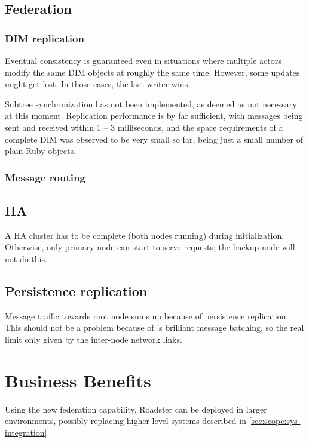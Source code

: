 \subsection{Federation}
\subsubsection{DIM replication}
Eventual consistency is guaranteed even in situations where multiple actors
modify the same DIM objects at roughly the same time. However, some updates
might get lost. In those cases, the last writer wins.


Subtree synchronization has not been implemented, as deemed as not necessary at
this moment. Replication performance is by far sufficient, with messages being
sent and received within 1 -- 3 milliseconds, and the space requirements of a
complete DIM was observed to be very small so far, being just a small number of
plain Ruby objects.

\subsubsection{Message routing}

\subsection{HA}
A HA cluster has to be complete (both nodes running) during initialization.
Otherwise, only primary node can start to serve requests; the backup node will not
do this.


\subsection{Persistence replication}
Message traffic towards root node sums up because of persistence
replication. This should not be a problem because of \zmq's brilliant
message batching, so the real limit only given by the inter-node network links.

\section{Business Benefits}
Using the new federation capability, Roadster can be deployed in larger
environments, possibly replacing higher-level systems described in
\autoref{sec:scope:sys-integration}.

